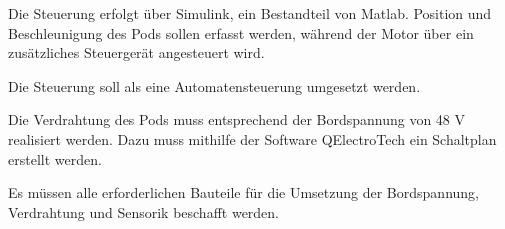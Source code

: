 Die Steuerung erfolgt über Simulink, ein Bestandteil von Matlab. Position und Beschleunigung des Pods sollen erfasst werden, während der Motor über ein zusätzliches Steuergerät angesteuert wird.

Die Steuerung soll als eine Automatensteuerung umgesetzt werden.

Die Verdrahtung des Pods muss entsprechend der Bordspannung von 48 V realisiert werden. Dazu muss mithilfe der Software QElectroTech ein Schaltplan erstellt werden.

Es müssen alle erforderlichen Bauteile für die Umsetzung der Bordspannung, Verdrahtung und Sensorik beschafft werden.



\pagebreak

